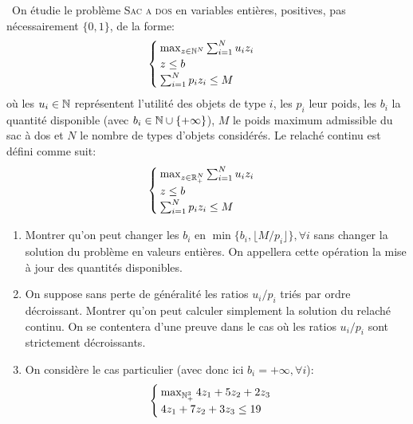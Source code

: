 \begin{td-exo}\, %
	On étudie le problème \textsc{Sac a dos} en variables entières, positives, pas nécessairement \(\{0, 1\}\), de la forme:
	\begin{equation*}
		\begin{cases}
			\max_{z \in {\mathbb{N}}^N} \sum_{i=1}^N u_i z_i\\
			z \leq b\\
			\sum_{i=1}^N p_i z_i \leq M
		\end{cases}
	\end{equation*}
	où les \(u_i\in\mathbb{N}\) représentent l'utilité des objets de type \(i\), les \(p_i\) leur poids, les \(b_i\) la quantité disponible (avec \(b_i \in\mathbb{N}\cup \{+\infty\}\)), \(M\) le poids maximum admissible du sac à dos et \(N\) le nombre de types d'objets considérés.
	Le relaché continu est défini comme suit:
	\begin{equation*}
		\begin{cases}
			\max_{z \in {\mathbb{R}}^N_+} \sum_{i=1}^N u_i z_i\\
			z \leq b\\
			\sum_{i=1}^N p_i z_i \leq M
		\end{cases}
	\end{equation*}
	\begin{enumerate}
		\item Montrer qu'on peut changer les \(b_i\) en \(\min\{b_i, \lfloor M/p_i \rfloor\}, \forall i\) sans changer la solution du problème en valeurs entières.
		On appellera cette opération la mise à jour des quantités disponibles.

		\item On suppose sans perte de généralité les ratios \(u_i/p_i\) triés par ordre décroissant.
		Montrer qu'on peut calculer simplement la solution du relaché continu.
		On se contentera d'une preuve dans le cas où les ratios \(u_i/p_i\) sont strictement décroissants.

		\item On considère le cas particulier (avec donc ici \(b_i = +\infty,\forall i\)):
		\begin{equation}\label{eq:ex3_1}
			\begin{cases}
				\max_{\mathbb{N}^3_+} 4z_1 + 5z_2 + 2 z_3\\
				4z_1 + 7z_2 + 3z_3 \leq 19
			\end{cases}
		\end{equation}


\end{enumerate}
\end{td-exo}
